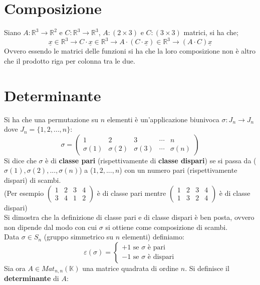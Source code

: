 \documentclass[a4paper,12pt, oneside]{book}
\begin{document}
\section{Composizione}
Siano $A:\mathbb{R}^3\rightarrow \mathbb{R}^2$ e $C:\mathbb{R}^3\rightarrow \mathbb{R}^3$, $A:(2\times 3)$ e $C:(3\times 3)$ matrici, si ha che;
$$\underline{x}	\in\mathbb{R}^3\rightarrow C\cdot\underline{x}	\in\mathbb{R}^3\rightarrow A\cdot(C\cdot\underline{x})	\in\mathbb{R}^3\rightarrow (A\cdot C)\underline{x}$$
Ovvero essendo le matrici delle funzioni si ha che la loro composizione non è altro che il prodotto riga per colonna tra le due.
\section{Determinante}
\begin{shaded}
\begin{definizione}[bonus]
Si ha che una permutazione su $n$ elementi è un'applicazione biunivoca $\sigma:J_n\rightarrow J_n$ dove $J_n=\{1,2,...,n\}$:
$$
 \sigma=\left(\begin{matrix}
 1 & 2 & 3 & \cdots & n\\
 \sigma(1) & \sigma(2) & \sigma(3) & \cdots & \sigma(n) 
 \end{matrix}\right)
 $$ 
Si dice che $\sigma$ è di \textbf{classe pari} (rispettivamente di \textbf{classe dispari}) se si passa da ($\sigma(1),\sigma(2),...,\sigma(n)$) a ($1,2,...,n$) con un numero pari (rispettivamente dispari) di scambi.\\
(Per esempio
$
\left(\begin{matrix}
1 & 2 & 3 & 4\\
3 & 4 & 1 & 2
\end{matrix}\right)
$ è di classe pari mentre $
\left(\begin{matrix}
1 & 2 & 3 & 4\\
1 & 3 & 2 & 4
\end{matrix}\right)
$ è di classe dispari)\\
Si dimostra che la definizione di classe pari e di classe dispari è ben posta, ovvero non dipende dal modo con cui $\sigma$ si ottiene come composizione di scambi.\\
Data $\sigma\in S_n$ (gruppo simmetrico su $n$ elementi) definiamo:
$$\varepsilon(\sigma)=\begin{cases}
+1  \mbox{   se } \sigma \mbox{ è pari}\\
-1  \mbox{   se } \sigma \mbox{ è dispari}
\end{cases}$$ 
Sia ora $A\in Mat_{n,n}(\mathbb{K})$ una matrice quadrata di ordine $n$. Si definisce il \textbf{determinante} di $A$:

\end{definizione}
\end{shaded}
\end{document}
